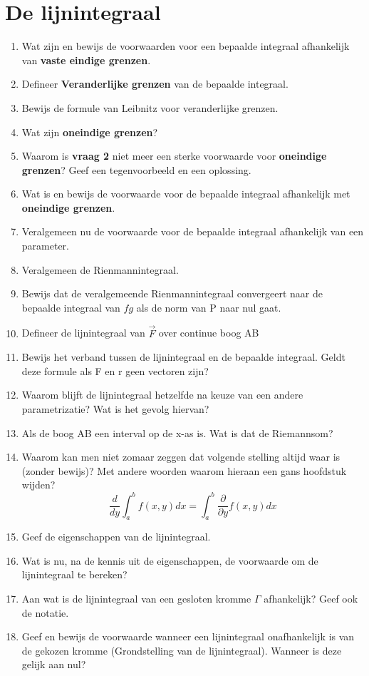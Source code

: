 \documentclass[a4paper,12pt]{article}
\begin{document}
    \maketitle


    \section{De lijnintegraal}
    \begin{enumerate}
        \item Wat zijn en bewijs de voorwaarden voor een bepaalde integraal afhankelijk van \textbf{vaste eindige grenzen}.
        \item Defineer \textbf{Veranderlijke grenzen} van de bepaalde integraal.
        \item Bewijs de formule van Leibnitz voor veranderlijke grenzen.
        \item Wat zijn \textbf{oneindige grenzen}?
        \item Waarom is \textbf{vraag 2} niet meer een sterke voorwaarde voor \textbf{oneindige grenzen}? Geef een tegenvoorbeeld en een oplossing.
        \item Wat is en bewijs de voorwaarde voor de bepaalde integraal afhankelijk met \textbf{oneindige grenzen}.
        \item Veralgemeen nu de voorwaarde voor de bepaalde integraal afhankelijk van een parameter.
        \item Veralgemeen de Rienmannintegraal.
        \item Bewijs dat de veralgemeende Rienmannintegraal convergeert naar de bepaalde integraal van $fg$ als de norm van P naar nul gaat.
        \item Defineer de lijnintegraal van $\vec{F}$ over continue boog AB
        \item Bewijs het verband tussen de lijnintegraal en de bepaalde integraal. Geldt deze formule als F en r geen vectoren zijn?
        \item Waarom blijft de lijnintegraal hetzelfde na keuze van een andere parametrizatie? Wat is het gevolg hiervan?
        \item Als de boog AB een interval op de x-as is. Wat is dat de Riemannsom?
        \item Waarom kan men niet zomaar zeggen dat volgende stelling altijd waar is (zonder bewijs)? Met andere woorden waarom hieraan een gans hoofdstuk wijden?
            $$ \frac{d}{dy}\int_a^b f(x,y)dx = \int_a^b \frac{\partial}{\partial y}f(x, y)dx $$
        \item Geef de eigenschappen van de lijnintegraal.
        \item Wat is nu, na de kennis uit de eigenschappen, de voorwaarde om de lijnintegraal te bereken?
        \item Aan wat is de lijnintegraal van een gesloten kromme $\Gamma$ afhankelijk? Geef ook de notatie.
        \item Geef en bewijs de voorwaarde wanneer een lijnintegraal onafhankelijk is van de gekozen kromme (Grondstelling van de lijnintegraal). Wanneer is deze gelijk aan nul?
    \end{enumerate}
\end{document}
